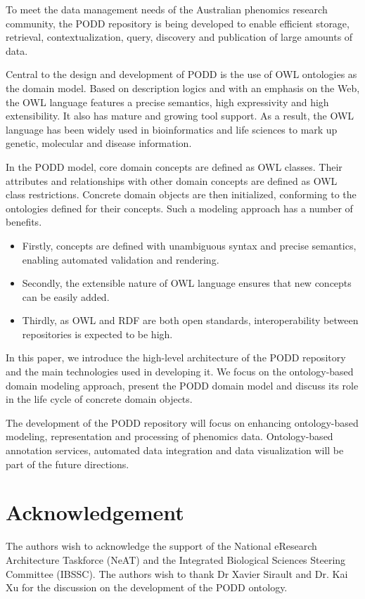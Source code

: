 \documentclass{llncs}
\begin{document}
To meet the data management needs of the Australian phenomics
research community, the PODD repository is being developed to enable
efficient storage, retrieval, contextualization, query, discovery
and publication of large amounts of data.

Central to the design and development of PODD is the use of OWL
ontologies as the domain model. Based on description logics and with
an emphasis on the Web, the OWL language features a precise
semantics, high expressivity and high extensibility. It also has
mature and growing tool support. As a result, the OWL language has
been widely used in bioinformatics and life sciences to mark up
genetic, molecular and disease information.

In the PODD model, core domain concepts are defined as OWL classes.
Their attributes and relationships with other domain concepts are
defined as OWL class restrictions. Concrete domain objects are then
initialized, conforming to the ontologies defined for their
concepts. Such a modeling approach has a number of benefits.

\begin{itemize}
\item Firstly, concepts are defined with unambiguous syntax and
precise semantics, enabling automated validation and rendering.

\item Secondly, the extensible nature of OWL language ensures that
new concepts can be easily added.

\item Thirdly, as OWL and RDF are both open standards,
interoperability between repositories is expected to be high.
\end{itemize}

In this paper, we introduce the high-level architecture of the PODD
repository and the main technologies used in developing it. We focus
on the ontology-based domain modeling approach, present the PODD
domain model and discuss its role in the life cycle of concrete
domain objects.

The development of the PODD repository will focus on enhancing
ontology-based modeling, representation and processing of phenomics
data. Ontology-based annotation services, automated data integration
and data visualization will be part of the future directions.

\section*{Acknowledgement}
The authors wish to acknowledge the support of the National
eResearch Architecture Taskforce (NeAT) and the Integrated
Biological Sciences Steering Committee (IBSSC). The authors wish to
thank Dr Xavier Sirault and Dr. Kai Xu for the discussion on the
development of the PODD ontology.



\end{document}
